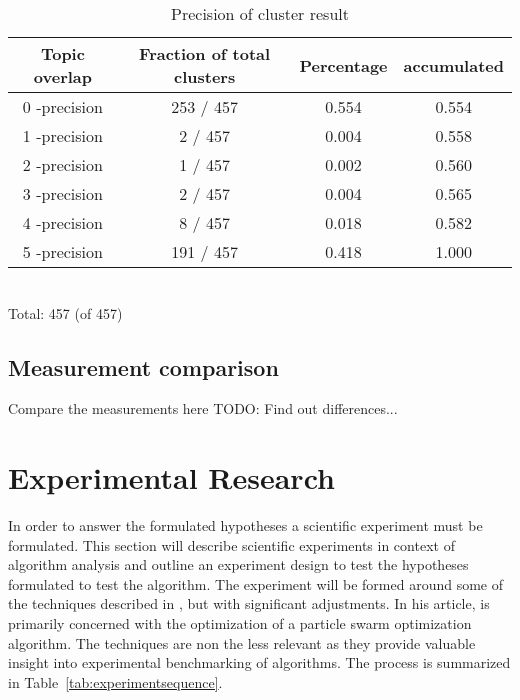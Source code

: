 \begin{table}[htdp]
\footnotesize

\begin{center}
\begin{tabular}{|c|c|c|c|}
\hline
Topic overlap &  Fraction of total clusters & Percentage  & accumulated\\ 
\hline
0 -precision & 253 / 457 & 0.554 & 0.554 \\
1 -precision & 2 / 457 & 0.004 & 0.558 \\
2 -precision & 1 / 457 & 0.002 & 0.560\\
3 -precision & 2 / 457 & 0.004 & 0.565\\
4 -precision & 8 / 457 & 0.018 & 0.582\\
5 -precision & 191 / 457 & 0.418 & 1.000\\
\hline
\end{tabular}
\\Total: 457 (of  457)
\end{center}
\caption{Precision of cluster result}
\label{tab:clusterprecision}
\end{table}


\subsection{Measurement comparison}
Compare the measurements here
TODO: Find out differences...

\section{Experimental Research}
\label{ExperimentalResearch}

In order to answer the formulated hypotheses a scientific experiment must be formulated. This section will describe scientific experiments in context of algorithm analysis and outline an experiment design to test the hypotheses formulated to test the \CTC algorithm. The experiment will be formed around some of the techniques described in \cite{Bartz-Beielstein2004}, but with significant adjustments. In his article, \citeauthor{Bartz-Beielstein2004} is primarily concerned with the optimization of a particle swarm optimization algorithm. The techniques are non the less relevant as they provide valuable insight into experimental benchmarking of algorithms. The process is summarized in Table~\ref{tab:experimentsequence}.

